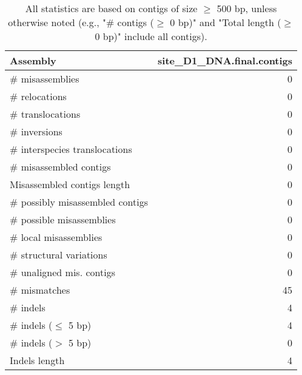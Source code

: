 \documentclass[12pt,a4paper]{article}
\begin{document}
\begin{table}[ht]
\begin{center}
\caption{All statistics are based on contigs of size $\geq$ 500 bp, unless otherwise noted (e.g., "\# contigs ($\geq$ 0 bp)" and "Total length ($\geq$ 0 bp)" include all contigs).}
\begin{tabular}{|l*{1}{|r}|}
\hline
Assembly & site\_D1\_DNA.final.contigs \\ \hline
\# misassemblies & 0 \\ \hline
\hspace{5mm}\# relocations & 0 \\ \hline
\hspace{5mm}\# translocations & 0 \\ \hline
\hspace{5mm}\# inversions & 0 \\ \hline
\hspace{5mm}\# interspecies translocations & 0 \\ \hline
\# misassembled contigs & 0 \\ \hline
Misassembled contigs length & 0 \\ \hline
\# possibly misassembled contigs & 0 \\ \hline
\hspace{5mm}\# possible misassemblies & 0 \\ \hline
\# local misassemblies & 0 \\ \hline
\# structural variations & 0 \\ \hline
\# unaligned mis. contigs & 0 \\ \hline
\# mismatches & 45 \\ \hline
\# indels & 4 \\ \hline
\hspace{5mm}\# indels ($\leq$ 5 bp) & 4 \\ \hline
\hspace{5mm}\# indels ($>$ 5 bp) & 0 \\ \hline
Indels length & 4 \\ \hline
\end{tabular}
\end{center}
\end{table}
\end{document}
